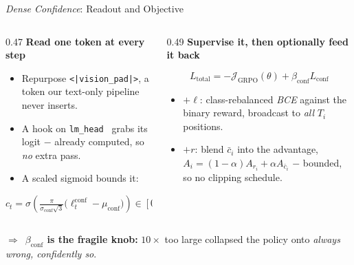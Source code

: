 \documentclass[aspectratio=169,10pt,t]{beamer}
\DeclareRobustCommand{\acit}[1]{\textit{\acs{#1}}}
\newcommand{\takeaway}[1]{%
	\vfill
	\setlength{\fboxsep}{4pt}%
	\noindent\colorbox{jkulight}{%
		\begin{minipage}{\dimexpr\textwidth-2\fboxsep\relax}%
			\footnotesize\raggedright\color{jkunavy}%
			\textcolor{jkumagenta}{\textbf{$\Rightarrow$}}~#1%
		\end{minipage}}%
	\vspace{1pt}%
}
\newcommand{\lead}[1]{{\color{jkunavy}\textbf{#1}}\par\vspace{1pt}}
\newcommand{\hl}[1]{\textcolor{jkumagenta}{\textbf{#1}}}
\newcommand{\nv}[1]{\textcolor{jkunavy}{\textbf{#1}}}
\begin{document}
\begin{frame}{\textit{Dense Confidence}: Readout and Objective}
	\begin{columns}[T, onlytextwidth]
		\begin{column}{0.47\textwidth}
			\lead{Read one token at every step}
			\begin{itemize}
				\setlength{\itemsep}{3pt}
				\item Repurpose \texttt{<|vision\_pad|>}, a token our text-only pipeline never inserts.
				\item A hook on \texttt{lm\_head}~\citep{pytorch} grabs its logit $-$ already computed, so \emph{no} extra pass.
				\item A scaled sigmoid bounds it:
			\end{itemize}
			\vspace{-0.08cm}
			\begin{equation*}
				c_t = \sigma\!\left(\tfrac{\pi}{\sigma_{\mathrm{conf}}\sqrt{3}}
				\bigl(\ell_t^{\mathrm{conf}} - \mu_{\mathrm{conf}}\bigr)\right) \in [0,1]
			\end{equation*}
		\end{column}
		\begin{column}{0.49\textwidth}
			\lead{Supervise it, then optionally feed it back}
			\vspace{-0.1cm}
			\begin{equation*}
				L_{\mathrm{total}} = -\mathcal{J}_{\mathrm{GRPO}}(\theta) + \beta_{\mathrm{conf}} L_{\mathrm{conf}}
			\end{equation*}
			\vspace{-0.35cm}
			\begin{itemize}
				\setlength{\itemsep}{3pt}
				\item \nv{$+\ell$}: class-rebalanced \acit{BCE} against the binary reward, broadcast to \emph{all} $T_i$ positions.
				\item \nv{$+r$}: blend $\bar c_i$ into the advantage, $A_i = (1-\alpha)A_{r_i} + \alpha A_{\bar c_i}$ $-$ bounded, so no clipping schedule.
			\end{itemize}
		\end{column}
	\end{columns}
	\takeaway{\hl{$\beta_{\mathrm{conf}}$ is the fragile knob:} $10\times$ too large collapsed the policy onto \emph{always wrong, confidently so}.}
\end{frame}
\end{document}
